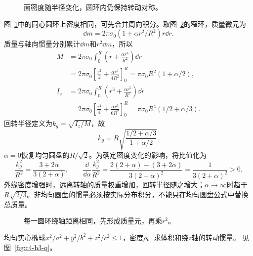 \begin{figure}[H]\centering
{}
\caption{面密度随半径变化，圆环内仍保持转动对称。}\label{fig:c4-h2-q}
\end{figure}
\begin{solution}
图~\ref{fig:c4-h2-q}中的同心圆环上密度相同，可先合并周向积分。取图~\ref{fig:c4-h2-s}的窄环，质量微元为
\[\dd m=2\pi\sigma_0(1+\alpha r^2/R^2)r\dd r.\]
质量与轴向惯量分别累计$\dd m$和$r^2\dd m$，所以
\[\begin{aligned}
M&=2\pi\sigma_0\int_0^R\left(r+\frac{\alpha r^3}{R^2}\right)\dd r\\
&=2\pi\sigma_0\left[\frac{r^2}{2}+\frac{\alpha r^4}{4R^2}\right]_0^R
=\boxed{\pi\sigma_0R^2(1+\alpha/2)},\\
I_z&=2\pi\sigma_0\int_0^R\left(r^3+\frac{\alpha r^5}{R^2}\right)\dd r\\
&=2\pi\sigma_0\left[\frac{r^4}{4}+\frac{\alpha r^6}{6R^2}\right]_0^R
=\boxed{\pi\sigma_0R^4(1/2+\alpha/3)}.
\end{aligned}\]
回转半径定义为$k_g=\sqrt{I_z/M}$，故
\[\boxed{k_g=R\sqrt{\frac{1/2+\alpha/3}{1+\alpha/2}}}.\]
$\alpha=0$恢复均匀圆盘的$R/\sqrt2$。为确定密度变化的影响，将比值化为
\[\frac{k_g^2}{R^2}=\frac{3+2\alpha}{3(2+\alpha)},\qquad
\frac{\dd}{\dd\alpha}\frac{k_g^2}{R^2}
=\frac{2(2+\alpha)-(3+2\alpha)}{3(2+\alpha)^2}
=\frac1{3(2+\alpha)^2}>0.\]
外缘密度增强时，远离转轴的质量权重增加，回转半径随之增大；$\alpha\to\infty$时趋于$R\sqrt{2/3}$。非均匀圆盘的惯量必须按实际分布积分，不能只在均匀圆盘公式中替换总质量。

\begin{figure}[H]\centering
{}
\caption{每一圆环绕轴距离相同，先形成质量元，再乘$r^2$。}\label{fig:c4-h2-s}
\end{figure}
\end{solution}

\begin{exercise}[椭球体积与惯量]\label{ex:c4-h3}
均匀实心椭球$x^2/a^2+y^2/b^2+z^2/c^2\le1$，密度$\rho$。求体积和绕$z$轴的转动惯量。 见图~\ref{fig:c4-h3-q}。
\end{exercise}

